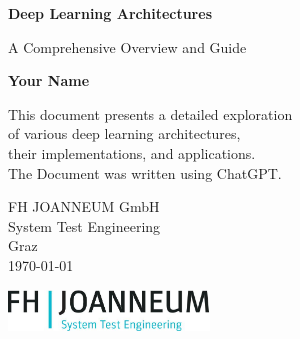 
\begin{titlepage}
    \centering
    \vspace*{1cm}
    
    \Huge
    \textbf{Deep Learning Architectures}
    
    \vspace{0.5cm}
    \LARGE
    A Comprehensive Overview and Guide
    
    \vspace{1.5cm}
    
    \textbf{Your Name}
    
    \vfill
    
    This document presents a detailed exploration \\
    of various deep learning architectures, \\
    their implementations, and applications. \\
    The Document was written using ChatGPT.
    
    \vspace{0.8cm}
    
    \Large
    FH JOANNEUM GmbH\\
    System Test Engineering\\
    Graz\\
    \today
    
    \vspace{2cm}
    
    \includegraphics[width=0.4\textwidth]{figures/logo_fhj_stm.jpg}
    
    \vspace{3cm}
\end{titlepage}
